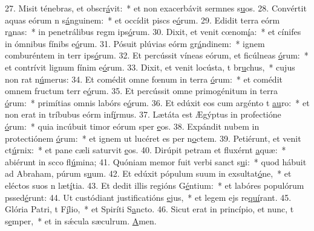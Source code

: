 27. Misit ténebras, et obscr\uline{á}vit:~* et non exacerbávit sermnes s\uline{u}os.
28. Convértit aquas eórum n s\uline{á}nguinem:~* et occídit piscs e\uline{ó}rum.
29. Edidit terra eórm r\uline{a}nas:~* in penetrálibus regm ips\uline{ó}rum.
30. Dixit, et venit cœnom\uline{í}a:~* et cínifes in ómnibus fínibs e\uline{ó}rum.
31. Pósuit plúvias eórm gr\uline{á}ndinem:~* ignem comburéntem in terr ips\uline{ó}rum.
32. Et percússit víneas eórum, et ficúlneas \uline{ó}rum:~* et contrívit lignum fínim e\uline{ó}rum.
33. Dixit, et venit locústa, t br\uline{u}chus,~* cujus non rat n\uline{ú}merus:
34. Et comédit omne fœnum in terra \uline{ó}rum:~* et comédit omnem fructum terr e\uline{ó}rum.
35. Et percússit omne primogénitum in terra \uline{ó}rum:~* primítias omnis labórs e\uline{ó}rum.
36. Et edúxit eos cum argénto t \uline{au}ro:~* et non erat in tríbubus eórm inf\uline{í}rmus.
37. Lætáta est Ægýptus in profectióne \uline{ó}rum:~* quia incúbuit timor eórum sper \uline{e}os.
38. Expándit nubem in protectiónem \uline{ó}rum:~* et ignem ut lucéret es per n\uline{o}ctem.
39. Petiérunt, et venit ct\uline{ú}rnix:~* et pane cæli saturvit \uline{e}os.
40. Dirúpit petram et fluxérnt \uline{a}quæ:~* abiérunt in scco fl\uline{ú}mina;
41. Quóniam memor fuit verbi sanct s\uline{u}i:~* quod hábuit ad Abraham, púrum s\uline{u}um.
42. Et edúxit pópulum suum in exsultat\uline{ó}ne,~* et eléctos suos n læt\uline{í}tia.
43. Et dedit illis regións G\uline{é}ntium:~* et labóres populórum pssed\uline{é}runt:
44. Ut custódiant justificatións \uline{e}jus,~* et legem ejs re\uline{quí}rant.
45. Glória Patri, t F\uline{í}lio,~* et Spiríti S\uline{a}ncto.
46. Sicut erat in princípio, et nunc, t s\uline{e}mper,~* et in sǽcula sæculrum. \uline{A}men.
